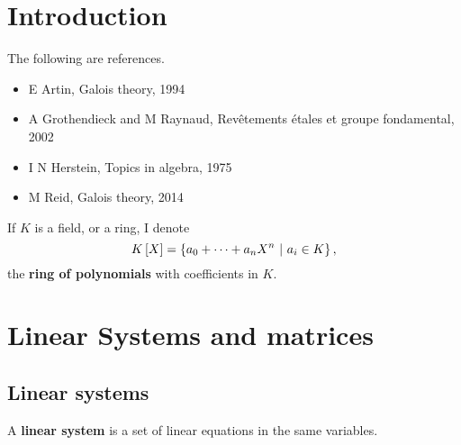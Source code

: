 \section{Introduction}


The following are references.
\begin{itemize}
\item E Artin, Galois theory, 1994
\item A Grothendieck and M Raynaud, Rev\^etements \'etales et groupe fondamental, 2002
\item I N Herstein, Topics in algebra, 1975
\item M Reid, Galois theory, 2014
\end{itemize}

\begin{notation*}
If $ K $ is a field, or a ring, I denote
$$ K\sbr{X} = \cbr{a_0 + \dots + a_nX^n \st a_i \in K}, $$
the \textbf{ring of polynomials} with coefficients in $ K $.
\end{notation*}

\section{Linear Systems and matrices}
\subsection{Linear systems}
\begin{definition}
    A \textbf{linear system} is a set of linear equations in the same variables.
\end{definition}

